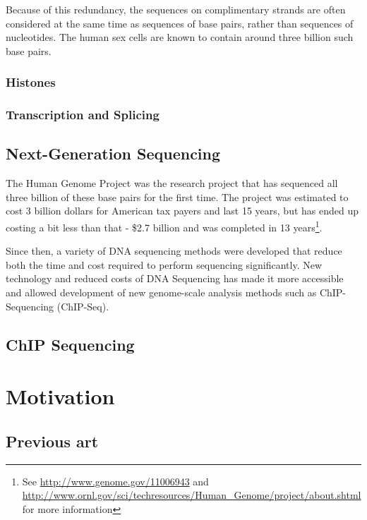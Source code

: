 \documentclass[parskip]{cs4rep}
\begin{document}
Because of this redundancy, the sequences on complimentary strands are often considered at the
same time as sequences of base pairs, rather than sequences of nucleotides. The
human sex cells are known to contain around three billion such base pairs.

\subsection{Histones}
\subsection{Transcription and Splicing}

\section{Next-Generation Sequencing}
The Human Genome Project was the research project that has sequenced all
three billion of these base pairs for the first time. The project was estimated
to cost 3 billion dollars for American tax payers and last 15 years, but has ended up
costing a bit less than that - \$2.7 billion and was completed in 13
years\footnote{See \url{http://www.genome.gov/11006943} and
    \url{http://www.ornl.gov/sci/techresources/Human_Genome/project/about.shtml}
    for more information}. 
    
 Since then, a variety of DNA sequencing methods were
developed that reduce both the time and cost required to perform sequencing
significantly\citep{Shendure:2008uc,Liu:2012ve}. New technology and reduced
costs of DNA Sequencing has made it more accessible and allowed
development of new genome-scale analysis methods such as ChIP-Sequencing
(ChIP-Seq).

\section{ChIP Sequencing}

\chapter{Motivation}


\section{Previous art}
\end{document}
